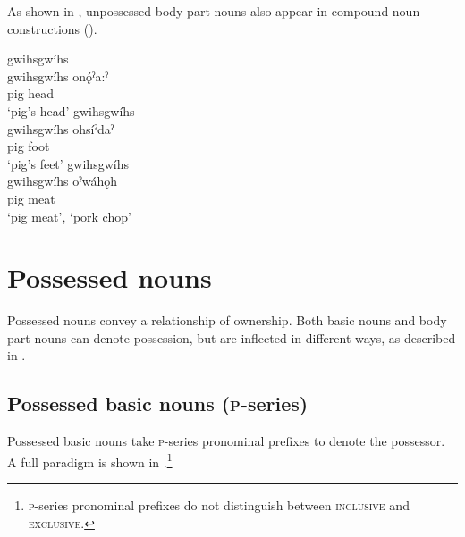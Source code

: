 As shown in , unpossessed body part nouns also appear in compound noun constructions (). 

\ea\label{ex:unpossnounppex5} 
\ea gwihsgwíhs   \\
\gll gwihsgwíhs onǫ́ˀa:ˀ\\
 pig head\\
\glt ‘pig’s head’
\ex gwihsgwíhs   \\
\gll gwihsgwíhs ohsíˀdaˀ\\
pig foot\\
\glt ‘pig’s feet’
\ex gwihsgwíhs   \\
\gll gwihsgwíhs oˀwáhǫh\\
pig meat\\
\glt  ‘pig meat’, ‘pork chop’
\z
\z


\section{Possessed nouns} \label{ch:Possessed nouns}
Possessed nouns convey a relationship of ownership. Both basic nouns and body part nouns can denote possession, but are inflected in different ways, as described in .


\subsection{Possessed basic nouns (\textsc{p}-series)} \label{ch:Possessed basic nouns (o series)}
Possessed basic nouns take \textsc{p}-series pronominal prefixes to denote the possessor. A full paradigm is shown in .\footnote{\textsc{p}-series pronominal prefixes do not distinguish between \textsc{inclusive} and \textsc{exclusive}.}


